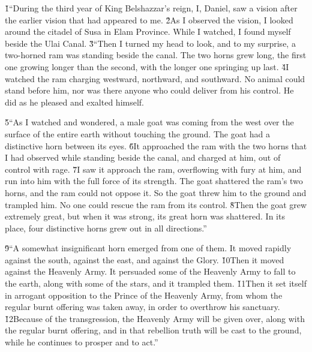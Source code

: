 \v{1}``During the third year of King Belshazzar's reign, I, Daniel, saw a vision after the earlier vision that had appeared to me. \v{2}As I observed the vision, I looked around the citadel of Susa in Elam Province. While I watched, I found myself beside the Ulai Canal. \v{3}``Then I turned my head to look, and to my surprise, a two-horned ram was standing beside the canal. The two horns grew long, the first one growing longer than the second, with the longer one springing up last. \v{4}I watched the ram charging westward, northward, and southward. No animal could stand before him, nor was there anyone who could deliver from his control. He did as he pleased and exalted himself.

\v{5}``As I watched and wondered, a male goat was coming from the west over the surface of the entire earth without touching the ground. The goat had a distinctive horn between its eyes. \v{6}It approached the ram with the two horns that I had observed while standing beside the canal, and charged at him, out of control with rage. \v{7}I saw it approach the ram, overflowing with fury at him, and run into him with the full force of its strength. The goat shattered the ram's two horns, and the ram could not oppose it. So the goat threw him to the ground and trampled him. No one could rescue the ram from its control. \v{8}Then the goat grew extremely great, but when it was strong, its great horn was shattered. In its place, four distinctive horns grew out in all directions.''

\v{9}``A somewhat insignificant horn emerged from one of them. It moved rapidly against the south, against the east, and against the Glory. \v{10}Then it moved against the Heavenly Army. It persuaded some of the Heavenly Army to fall to the earth, along with some of the stars, and it trampled them. \v{11}Then it set itself in arrogant opposition to the Prince of the Heavenly Army, from whom the regular burnt offering was taken away, in order to overthrow his sanctuary. \v{12}Because of the transgression, the Heavenly Army will be given over, along with the regular burnt offering, and in that rebellion truth will be cast to the ground, while he continues to prosper and to act.''

